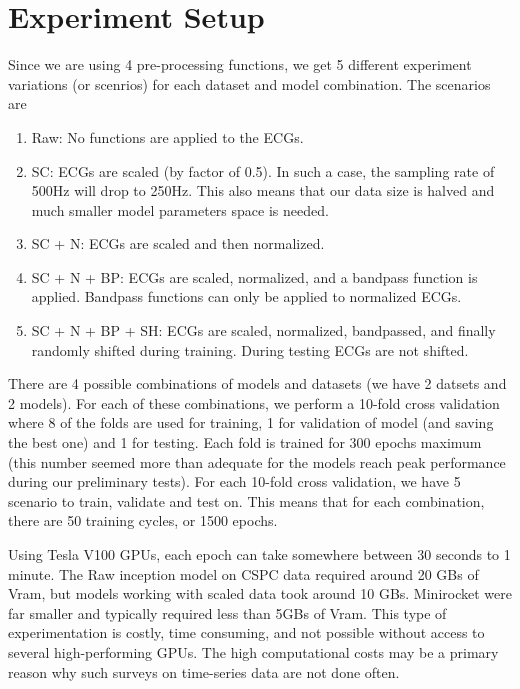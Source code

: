\documentclass{article}
\begin{document}
\section{Experiment Setup}
Since we are using 4 pre-processing functions, we get 5 different experiment variations (or scenrios) for each dataset and model combination. The scenarios are \begin{enumerate}
  \item Raw: No functions are applied to the ECGs.
  \item SC: ECGs are scaled (by factor of 0.5). In such a case, the sampling rate of 500Hz will drop to 250Hz. This also means that our data size is halved and much smaller model parameters space is needed.
  \item SC + N: ECGs are scaled and then normalized.
  \item SC + N + BP: ECGs are scaled, normalized, and a bandpass function is applied. Bandpass functions can only be applied to normalized ECGs.
  \item SC + N + BP + SH: ECGs are scaled, normalized, bandpassed, and finally randomly shifted during training. During testing ECGs are not shifted. 
\end{enumerate}
There are 4 possible combinations of models and datasets (we have 2 datsets and 2 models). For each of these combinations, we perform a 10-fold cross validation where 8 of the folds are used for training, 1 for validation of model (and saving the best one) and 1 for testing. Each fold is trained for 300 epochs maximum (this number seemed more than adequate for the models reach peak performance during our preliminary tests). For each 10-fold cross validation, we have 5 scenario to train, validate and test on. This means that for each combination, there are 50 training cycles, or 1500 epochs. 

Using Tesla V100 GPUs, each epoch can take somewhere between 30 seconds to 1 minute. The Raw inception model on CSPC data required around 20 GBs of Vram, but models working with scaled data took around 10 GBs. Minirocket were far smaller and typically required less than 5GBs of Vram. This type of experimentation is costly, time consuming, and not possible without access to several high-performing GPUs. The high computational costs may be a primary reason why such surveys on time-series data are not done often.
\end{document}

